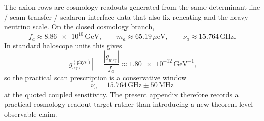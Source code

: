 The axion rows are cosmology readouts generated from the same determinant-line / seam-transfer /
scalaron interface data that also fix reheating and the heavy-neutrino scale. On the closed
cosmology branch,
\[
f_a\approx \num{8.86e10}\,\mathrm{GeV},
\qquad
m_a\approx \num{65.19}\,\mu\mathrm{eV},
\qquad
\nu_a\approx \num{15.764}\,\mathrm{GHz}.
\]
In standard haloscope units this gives
\[
\left|g_{a\gamma\gamma}^{(\mathrm{phys})}\right|
=
\frac{|g_{a\gamma\gamma}|}{f_a}
\approx
\num{1.80e-12}\,\mathrm{GeV}^{-1},
\]
so the practical scan prescription is a conservative window
\[
\nu_a=\num{15.764}\,\mathrm{GHz}\pm \num{50}\,\mathrm{MHz}
\]
at the quoted coupled sensitivity. The present appendix therefore records a practical cosmology
readout target rather than introducing a new theorem-level observable claim.

